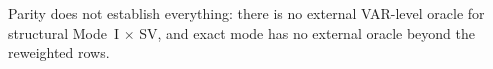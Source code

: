 \begin{itemize}
\end{itemize}
Parity does not establish everything: there is no external VAR-level oracle for structural Mode~I
$\times$ SV, and exact mode has no external oracle beyond the reweighted  rows.

\begin{table}[!htbp]
\centering\small
\caption{Parity summary: oracle and version, rows, statistic, bound, and maximum $|z|$ or
relative tolerance.}
\label{tab:TabD2}

\end{table}

